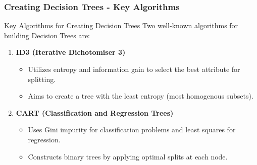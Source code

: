 \documentclass[aspectratio=169]{beamer}
\begin{document}
\begin{frame}[fragile]
    \frametitle{Creating Decision Trees - Key Algorithms}
    \begin{block}{Key Algorithms for Creating Decision Trees}
        Two well-known algorithms for building Decision Trees are:
        \begin{enumerate}
            \item \textbf{ID3 (Iterative Dichotomiser 3)}
                \begin{itemize}
                    \item Utilizes entropy and information gain to select the best attribute for splitting.
                    \item Aims to create a tree with the least entropy (most homogenous subsets).
                \end{itemize}
            \item \textbf{CART (Classification and Regression Trees)}
                \begin{itemize}
                    \item Uses Gini impurity for classification problems and least squares for regression.
                    \item Constructs binary trees by applying optimal splits at each node.
                \end{itemize}
        \end{enumerate}
    \end{block}
\end{frame}
\end{document}

